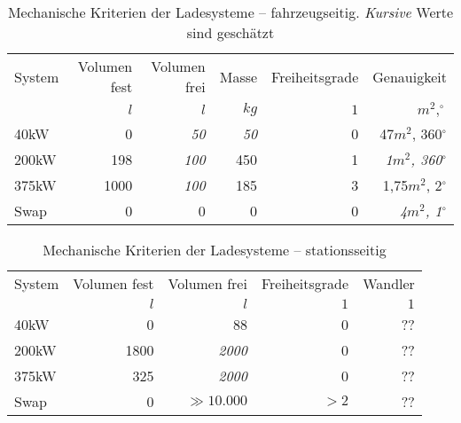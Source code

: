 \begin{table}[h!]\centering
	\begin{tabularx}{\linewidth}{Xrrrrr}
		\toprule
		System & Volumen fest & Volumen frei  & Masse     & Freiheitsgrade & Genauigkeit            \\
		       & $l$       & $l$        & $kg$      & $1$            & $m^2,^{\circ}$         \\ \midrule
		40kW   & 0         & \emph{50}  & \emph{50} & 0              & 47$m^2$, 360$^{\circ}$ \\
		200kW  & 198       & \emph{100} & 450       & 1              & \emph{1$m^2$, 360$^{\circ}$}                    \\
		375kW  & 1000      & \emph{100} & 185       & 3              & 1,75$m^2$, 2$^{\circ}$ \\
		Swap   & 0         & 0          & 0         & 0              & \emph{4$m^2$, 1$^{\circ}$}              \\ \bottomrule
	\end{tabularx}
	\caption[Mechanische Kriterien der Ladesysteme – fahrzeugseitig]{Mechanische Kriterien der Ladesysteme – fahrzeugseitig. \emph{Kursive} Werte sind geschätzt}
	\label{tab_mech_Ladesys_fzg}
\end{table}

\begin{table}[h!]\centering
	\begin{tabularx}{\linewidth}{Xrrrr}
		\toprule
		System & Volumen fest &   Volumen frei & Freiheitsgrade & Wandler \\
		       &       $l$ &         $l$ &            $1$ &     $1$ \\ \midrule
		40kW   &         0 &          88 &              0 &      ?? \\
		200kW  &      1800 & \emph{2000} &              0 &      ?? \\
		375kW  &       325 & \emph{2000} &              0 &      ?? \\
		Swap   &         0 & $\gg10.000$ &           $>2$ &      ?? \\ \bottomrule
	\end{tabularx}
	\caption{Mechanische Kriterien der Ladesysteme – stationsseitig}
	\label{tab_mech_Ladesys_stat}
\end{table}
\FloatBarrier


